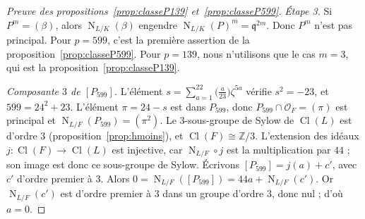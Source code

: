 \documentclass[11pt,a4paper]{amsart}
\theoremstyle{plain}
\theoremstyle{definition}
\numberwithin{equation}{section}
\newcommand{\Z}{\mathbb{Z}}
\newcommand{\OO}{\mathcal{O}}
\newcommand{\q}{\mathfrak{q}}
\DeclareMathOperator{\Nm}{N}
\DeclareMathOperator{\Cl}{Cl}
\begin{document}
\begin{proof}[Preuve des propositions~\ref{prop:classeP139} et~\ref{prop:classeP599}]
\emph{Étape 3.} Si $P^m=(\beta)$, alors $\Nm_{L/K}(\beta)$ engendre $\Nm_{L/K}(P)^m=\q^{2m}$. Donc $P^m$ n'est pas principal. Pour $p=599$, c'est la première assertion de la proposition~\ref{prop:classeP599}. Pour $p=139$, nous n'utilisons que le cas $m=3$, qui est la proposition~\ref{prop:classeP139}.

\emph{Composante $3$ de $[P_{599}]$.} L'élément $s=\sum_{a=1}^{22}\bigl(\frac a{23}\bigr)\zeta^{5a}$ vérifie $s^2=-23$, et $599=24^2+23$. L'élément $\pi=24-s$ est dans $P_{599}$, donc $P_{599}\cap\OO_F=(\pi)$ est principal et $\Nm_{L/F}(P_{599})=(\pi^2)$. Le $3$-sous-groupe de Sylow de $\Cl(L)$ est d'ordre $3$ (proposition~\ref{prop:hmoins}), et $\Cl(F)\cong\Z/3$. L'extension des idéaux $j\colon\Cl(F)\to\Cl(L)$ est injective, car $\Nm_{L/F}\circ j$ est la multiplication par $44$ ; son image est donc ce sous-groupe de Sylow. Écrivons $[P_{599}]=j(a)+c'$, avec $c'$ d'ordre premier à $3$. Alors $0=\Nm_{L/F}([P_{599}])=44a+\Nm_{L/F}(c')$. Or $\Nm_{L/F}(c')$ est d'ordre premier à $3$ dans un groupe d'ordre $3$, donc nul ; d'où $a=0$.
\end{proof}
\end{document}
